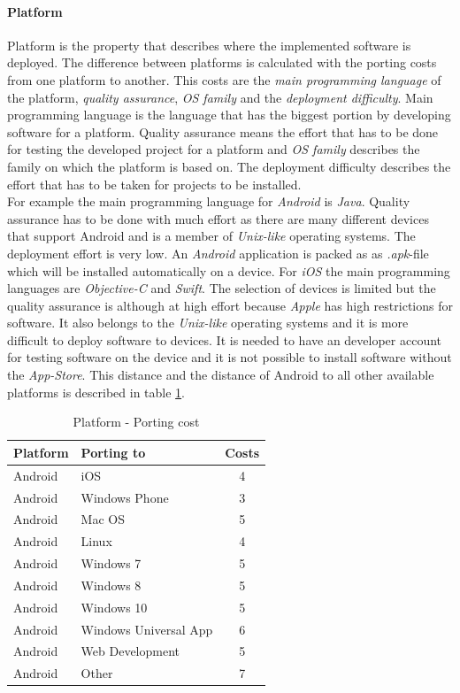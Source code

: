 \paragraph*{\textbf{Platform}}
Platform is the property that describes where the implemented software is deployed. The difference between platforms is calculated with the porting costs from one platform to another. This costs are the \textit{main programming language} of the platform, \textit{quality assurance}, \textit{OS family} and the \textit{deployment difficulty}. Main programming language is the language that has the biggest portion by developing software for a platform. Quality assurance means the effort that has to be done for testing the developed project for a platform and \textit{OS family} describes the family on which the platform is based on. The deployment difficulty describes the effort that has to be taken for projects to be installed.\\
For example the main programming language for \textit{Android} is \textit{Java}. Quality assurance has to be done with much effort as there are many different devices that support Android and is a member of \textit{Unix-like} operating systems. The deployment effort is very low. An \textit{Android} application is packed as as \textit{.apk}-file which will be installed automatically on a device. For \textit{iOS} the main programming languages are \textit{Objective-C} and \textit{Swift}. The selection of devices is limited but the quality assurance is although at high effort because \textit{Apple} has high restrictions for software. It also belongs to the \textit{Unix-like} operating systems and it is more difficult to deploy software to devices. It is needed to have an developer account for testing software on the device and it is not possible to install software without the \textit{App-Store}. This distance and the distance of Android to all other available platforms is described in table \ref{property:platform}.
\begin{table}[h]
	\centering 
	\setlength{\tabcolsep}{4pt}
	\begin{tabular}{|l|l|c|}\hline
		Platform			& Porting to 	&  Costs 	\\ \hline
		Android   			& iOS					& 4      		\\ \hline
		Android   			& Windows Phone 		& 3      		\\ \hline
		Android   			& Mac OS 				& 5     		\\ \hline
		Android   			& Linux 				& 4     		\\ \hline
		Android  			& Windows 7 			& 5     		\\ \hline
		Android  			& Windows 8				& 5     		\\ \hline
		Android  			& Windows 10 			& 5     		\\ \hline
		Android  			& Windows Universal App	& 6     		\\ \hline
		Android  			& Web Development 		& 5     		\\ \hline
		Android  			& Other 				& 7     		\\ \hline
	\end{tabular} 
	\caption{Platform - Porting cost} 
	\label{property:platform} 
\end{table}

